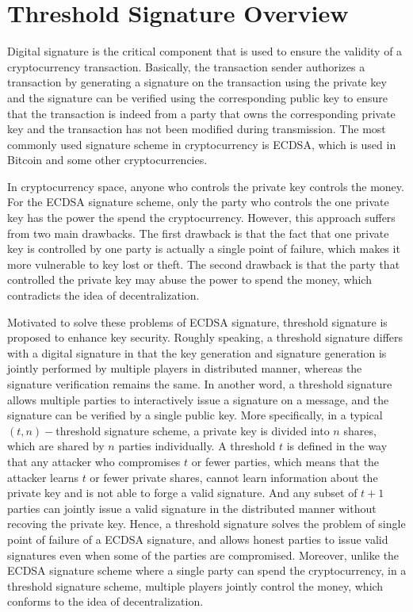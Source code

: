 \documentclass[12pt]{report}
\begin{document}
\section{Threshold Signature Overview}
Digital signature is the critical component that is used to ensure the validity of a cryptocurrency transaction. Basically, the transaction sender authorizes a transaction by generating a signature on the transaction using the private key and the signature can be verified using the corresponding public key to ensure that the transaction is indeed from a party that owns the corresponding private key and the transaction has not been modified during transmission. The most commonly used signature scheme in cryptocurrency is ECDSA, which is used in Bitcoin and some other cryptocurrencies. 

In cryptocurrency space, anyone who controls the private key controls the money. For the ECDSA signature scheme, only the party who controls the one private key has the power the spend the cryptocurrency. However, this approach suffers from two main drawbacks. The first drawback is that the fact that one private key is controlled by one party is actually a single point of failure, which makes it more vulnerable to key lost or theft. The second drawback is that the party that controlled the private key may abuse the power to spend the money, which contradicts the idea of decentralization.

Motivated to solve these problems of ECDSA signature, threshold signature is proposed to enhance key security. Roughly speaking, a threshold signature differs with a digital signature in that the key generation and signature generation is jointly performed by multiple players in distributed manner, whereas the signature verification remains the same. In another word, a threshold signature allows multiple parties to interactively issue a signature on a message, and the signature can be verified by a single public key. More specifically, in a typical $(t,n)-$threshold signature scheme, a private key is divided into $n$ shares, which are shared by $n$ parties individually. A threshold $t$ is defined in the way that any attacker who compromises $t$ or fewer parties, which means that the attacker learns $t$ or fewer private shares, cannot learn information about the private key and is not able to forge a valid signature. And any subset of $t+1$ parties can jointly issue a valid signature in the distributed manner without recoving the private key. Hence, a threshold signature solves the problem of single point of failure of a ECDSA signature, and allows honest parties to issue valid signatures even when some of the parties are compromised. Moreover, unlike the ECDSA signature scheme where a single party can spend the cryptocurrency, in a threshold signature scheme, multiple players jointly control the money, which conforms to the idea of decentralization.
\end{document}
